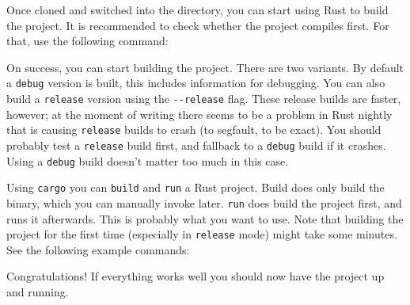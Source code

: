\documentclass{standalone}
\begin{document}
  Once cloned and switched into the directory, you can start using Rust to build
  the project. It is recommended to check whether the project compiles first.
  For that, use the following command:

  

  On success, you can start building the project. There are two variants. By
  default a \verb_debug_ version is built, this includes information for
  debugging. You can also build a \verb_release_ version using the
  \verb_--release_ flag. These release builds are faster, however; at the
  moment of writing there seems to be a problem in Rust nightly that is causing
  \verb_release_ builds to crash (to segfault, to be exact). You should probably
  test a \verb_release_ build first, and fallback to a \verb_debug_ build if it
  crashes. Using a \verb_debug_ build doesn't matter too much in this case.

  Using \verb_cargo_ you can \verb_build_ and \verb_run_ a Rust project. Build
  does only build the binary, which you can manually invoke later. \verb_run_
  does build the project first, and runs it afterwards. This is probably what
  you want to use. Note that building the project for the first time
  (especially in \verb_release_ mode) might take some minutes.
  See the following example commands:

  

  Congratulations! If everything works well you should now have the project up
  and running.

  \clearpage
\end{document}
